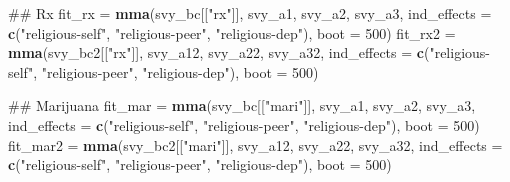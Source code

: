 \documentclass[]{article}
\newenvironment{Shaded}{\begin{snugshade}}{\end{snugshade}}
\newcommand{\KeywordTok}[1]{\textcolor[rgb]{0.13,0.29,0.53}{\textbf{#1}}}
\newcommand{\DataTypeTok}[1]{\textcolor[rgb]{0.13,0.29,0.53}{#1}}
\newcommand{\DecValTok}[1]{\textcolor[rgb]{0.00,0.00,0.81}{#1}}
\newcommand{\StringTok}[1]{\textcolor[rgb]{0.31,0.60,0.02}{#1}}
\newcommand{\NormalTok}[1]{#1}
\begin{document}
\begin{Shaded}
\begin{Highlighting}[]
\NormalTok{## Rx}
\NormalTok{fit_rx =}\StringTok{ }\KeywordTok{mma}\NormalTok{(svy_bc[[}\StringTok{"rx"}\NormalTok{]],}
\NormalTok{              svy_a1,}
\NormalTok{              svy_a2,}
\NormalTok{              svy_a3,}
              \DataTypeTok{ind_effects =} \KeywordTok{c}\NormalTok{(}\StringTok{"religious-self"}\NormalTok{,}
                              \StringTok{"religious-peer"}\NormalTok{,}
                              \StringTok{"religious-dep"}\NormalTok{),}
              \DataTypeTok{boot =} \DecValTok{500}\NormalTok{)}
\NormalTok{fit_rx2 =}\StringTok{ }\KeywordTok{mma}\NormalTok{(svy_bc2[[}\StringTok{"rx"}\NormalTok{]],}
\NormalTok{               svy_a12,}
\NormalTok{               svy_a22,}
\NormalTok{               svy_a32,}
               \DataTypeTok{ind_effects =} \KeywordTok{c}\NormalTok{(}\StringTok{"religious-self"}\NormalTok{,}
                               \StringTok{"religious-peer"}\NormalTok{,}
                               \StringTok{"religious-dep"}\NormalTok{),}
               \DataTypeTok{boot =} \DecValTok{500}\NormalTok{)}

\NormalTok{## Marijuana}
\NormalTok{fit_mar =}\StringTok{ }\KeywordTok{mma}\NormalTok{(svy_bc[[}\StringTok{"mari"}\NormalTok{]],}
\NormalTok{             svy_a1,}
\NormalTok{             svy_a2,}
\NormalTok{             svy_a3,}
             \DataTypeTok{ind_effects =} \KeywordTok{c}\NormalTok{(}\StringTok{"religious-self"}\NormalTok{,}
                             \StringTok{"religious-peer"}\NormalTok{,}
                             \StringTok{"religious-dep"}\NormalTok{),}
             \DataTypeTok{boot =} \DecValTok{500}\NormalTok{)}
\NormalTok{fit_mar2 =}\StringTok{ }\KeywordTok{mma}\NormalTok{(svy_bc2[[}\StringTok{"mari"}\NormalTok{]],}
\NormalTok{              svy_a12,}
\NormalTok{              svy_a22,}
\NormalTok{              svy_a32,}
              \DataTypeTok{ind_effects =} \KeywordTok{c}\NormalTok{(}\StringTok{"religious-self"}\NormalTok{,}
                              \StringTok{"religious-peer"}\NormalTok{,}
                              \StringTok{"religious-dep"}\NormalTok{),}
              \DataTypeTok{boot =} \DecValTok{500}\NormalTok{)}


\end{Highlighting}
\end{Shaded}
\end{document}
